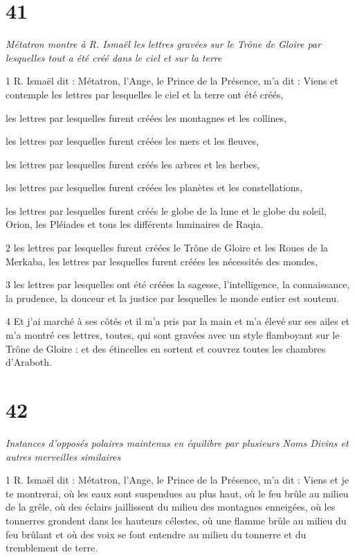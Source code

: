\chapter{41}

\par \textit{Métatron montre à R. Ismaël les lettres gravées sur le Trône de Gloire par lesquelles tout a été créé dans le ciel et sur la terre}

\par 1 R. Ismaël dit : Métatron, l'Ange, le Prince de la Présence, m'a dit : Viens et contemple les lettres par lesquelles le ciel et la terre ont été créés,
\par les lettres par lesquelles furent créées les montagnes et les collines,
\par les lettres par lesquelles furent créées les mers et les fleuves,
\par les lettres par lesquelles furent créés les arbres et les herbes,
\par les lettres par lesquelles furent créées les planètes et les constellations,
\par les lettres par lesquelles furent créés le globe de la lune et le globe du soleil, Orion, les Pléiades et tous les différents luminaires de Raqia.

\par 2 les lettres par lesquelles furent créées le Trône de Gloire et les Roues de la Merkaba, les lettres par lesquelles furent créées les nécessités des mondes,

\par 3 les lettres par lesquelles ont été créées la sagesse, l'intelligence, la connaissance, la prudence, la douceur et la justice par lesquelles le monde entier est soutenu.

\par 4 Et j'ai marché à ses côtés et il m'a pris par la main et m'a élevé sur ses ailes et m'a montré ces lettres, toutes, qui sont gravées avec un style flamboyant sur le Trône de Gloire : et des étincelles en sortent et couvrez toutes les chambres d'Araboth.


\chapter{42}

\par \textit{Instances d'opposés polaires maintenus en équilibre par plusieurs Noms Divins et autres merveilles similaires}

\par 1 R. Ismaël dit : Métatron, l'Ange, le Prince de la Présence, m'a dit : Viens et je te montrerai, où les eaux sont suspendues au plus haut, où le feu brûle au milieu de la grêle, où des éclairs jaillissent du milieu des montagnes enneigées, où les tonnerres grondent dans les hauteurs célestes, où une flamme brûle au milieu du feu brûlant et où des voix se font entendre au milieu du tonnerre et du tremblement de terre.

